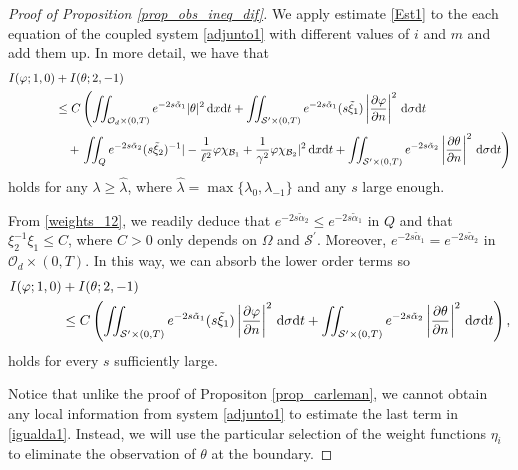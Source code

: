 \documentclass{aims}
\theoremstyle{definition}
\newcommand\csin[1]{\chi_{#1}}
\def\dx{\,\textnormal{d}x}
\def\dt{\textnormal{d}t}
\def\d{\,\textnormal{d}}
\begin{document}
\begin{proof}[Proof of Proposition \ref{prop_obs_ineq_dif}]
We apply estimate \eqref{Est1} to the each equation of the coupled system \eqref{adjunto1} with different values of $i$ and $m$ and add them up. In more detail, we have that
%
\begin{align}\notag
I(\varphi;1,0)&+I(\theta;2, -1)\\\notag
&\leq C\left(\iint_{\mathcal O_d\times(0,T)}e^{-2s\tilde{\alpha}_1}|\theta|^2\dx\dt+\iint_{\mathcal S^\prime\times(0,T)}e^{-2s\tilde{\alpha}_1}(s\tilde{\xi}_1)\left|\frac{\partial \varphi}{\partial n}\right|^2\d\sigma\dt\right.\\ \notag
&\quad+\left.\iint_{Q}e^{-2s\tilde{\alpha}_2}(s\tilde{\xi}_2)^{-1}|-\frac{1}{\ell^2}\varphi\csin{\mathcal B_1}+\frac{1}{\gamma^2}\varphi \csin{\mathcal B_2}|^2\dx\dt+\iint_{\mathcal S^\prime\times(0,T)}e^{-2s\tilde{\alpha}_2}\left|\frac{\partial \theta}{\partial n}\right|^2\d\sigma\dt\right)%
\end{align}
%
holds for any $\lambda\geq\hat\lambda$, where $\hat{\lambda}=\max\{\lambda_0,\lambda_{-1}\}$ and any $s$ large enough.

From \eqref{weights_12}, we readily deduce that $e^{-2s\tilde\alpha_2}\leq e^{-2s\tilde\alpha_1}$ in $Q$ and that $\xi_2^{-1}\xi_1\leq C$, where $C>0$ only depends on $\Omega$ and $\mathcal S^\prime$. Moreover, $e^{-2s\tilde\alpha_1}=e^{-2s\tilde\alpha_2}$ in  $\mathcal O_d\times(0,T)$. In this way, we can absorb the lower order terms so 
\begin{align}\notag
I(\varphi;1,0)&+I(\theta;2, -1)\\ \label{igualda1}
&\leq C\left(\iint_{\mathcal S^{\prime}\times(0,T)}e^{-2s\tilde{\alpha}_1}(s\tilde{\xi}_1)\left|\frac{\partial \varphi}{\partial n}\right|^2\d\sigma\dt+\iint_{\mathcal S^\prime\times(0,T)}e^{-2s\tilde{\alpha}_2}\left|\frac{\partial \theta}{\partial n}\right|^2\d\sigma\dt\right),
\end{align}
holds for every $s$ sufficiently large.

 Notice that unlike the proof of Propositon \ref{prop_carleman}, we cannot obtain any local information from system \eqref{adjunto1} to estimate the last term in \eqref{igualda1}. Instead, we will use the particular selection of the weight functions $\eta_i$ to eliminate the observation of $\theta$ at the boundary.
 

\end{proof}
\end{document}
